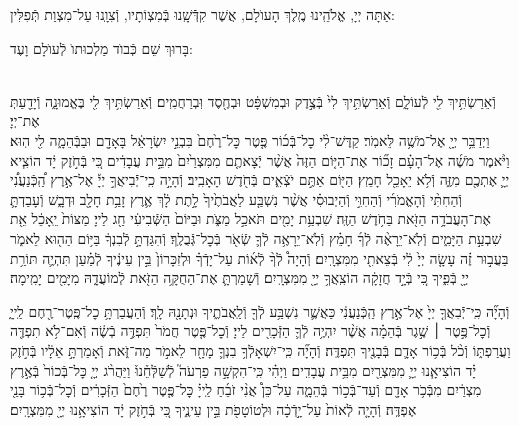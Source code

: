 \documentclass[twoside, openany, parskip=half, 11pt]{book}
\begin{document}
אַתָּה יְיָ, אֱלֹהֵֽינוּ מֶֽלֶךְ הָעוֺלָם, אֲשֶׁר קִדְּֿֿשָֽׁנוּ בְּֿמִצְוֹתָיו, וְֿצִוָֽנוּ עַל־מִצְוַת תְּֿפִלִּין:

בָּרוּךְ שֵׁם כְּֿבוֺד מַלְכוּתוֺ לְֿעוֺלָם וָעֶד:


\\
וְֿאֵרַשְׂתִּ֥יךְ לִ֖י לְֿעוֹלָ֑ם וְֿאֵרַשְׂתִּ֥יךְ לִי֙ בְּֿצֶ֣דֶק וּבְמִשְׁפָּ֔ט וּבְחֶ֖סֶד וּֽבְרַחֲמִֽים׃ וְֿאֵרַשְׂתִּ֥יךְ לִ֖י בֶּאֱמוּנָ֑ה וְֿיָדַ֖עַתְּ אֶת־יְיָ׃\\
וַיְדַבֵּ֥ר יְיָ֖ אֶל־מֹשֶׁ֥ה לֵּאמֹֽר׃ קַדֶּשׁ־לִ֨י כׇל־בְּֿכ֜וֹר פֶּ֤טֶר כׇּל־רֶ֙חֶם֙ בִּבְנֵ֣י יִשְׂרָאֵ֔ל בָּאָדָ֖ם וּבַבְּֿהֵמָ֑ה לִ֖י הֽוּא׃ וַיֹּ֨אמֶר מֹשֶׁ֜ה אֶל־הָעָ֗ם זָכ֞וֹר אֶת־הַיּ֤וֹם הַזֶּה֙ אֲשֶׁ֨ר יְֿצָאתֶ֤ם מִמִּצְרַ֙יִם֙ מִבֵּ֣ית עֲבָדִ֔ים כִּ֚י בְּֿחֹ֣זֶק יָ֔ד הוֹצִ֧יא יְיָ֛ אֶתְכֶ֖ם מִזֶּ֑ה וְֿלֹ֥א יֵאָכֵ֖ל חָמֵֽץ׃ הַיּ֖וֹם אַתֶּ֣ם יֹצְֿאִ֑ים בְּֿחֹ֖דֶשׁ הָאָבִֽיב׃ וְֿהָיָ֣ה כִֽי־יְֿֿבִיאֲךָ֣ יְיָ֡ אֶל־אֶ֣רֶץ הַֽ֠כְּֿנַעֲנִ֠י וְֿהַחִתִּ֨י וְֿהָאֱמֹרִ֜י וְֿהַחִוִּ֣י וְֿהַיְבוּסִ֗י אֲשֶׁ֨ר נִשְׁבַּ֤ע לַאֲבֹתֶ֙יךָ֙ לָ֣תֶת לָ֔ךְ אֶ֛רֶץ זָבַ֥ת חָלָ֖ב וּדְבָ֑שׁ וְֿעָבַדְתָּ֛ אֶת־הָעֲבֹדָ֥ה הַזֹּ֖את בַּחֹ֥דֶשׁ הַזֶּֽה׃ שִׁבְעַ֥ת יָמִ֖ים תֹּאכַ֣ל מַצֹּ֑ת וּבַיּוֹם֙ הַשְּֿׁבִיעִ֔י חַ֖ג לַייָ׃ מַצּוֹת֙ יֵֽאָכֵ֔ל אֵ֖ת שִׁבְעַ֣ת הַיָּמִ֑ים וְֿלֹֽא־יֵרָאֶ֨ה לְֿךָ֜ חָמֵ֗ץ וְֿלֹֽא־יֵרָאֶ֥ה לְֿךָ֛ שְֿׂאֹ֖ר בְּֿכׇל־גְּֿבֻלֶֽךָ׃ וְֿהִגַּדְתָּ֣ לְֿבִנְךָ֔ בַּיּ֥וֹם הַה֖וּא לֵאמֹ֑ר בַּעֲב֣וּר זֶ֗ה עָשָׂ֤ה יְיָ֙ לִ֔י בְּֿצֵאתִ֖י מִמִּצְרָֽיִם׃ וְֿהָיָה֩ לְֿךָ֨ לְֿא֜וֹת עַל־יָדְֿךָ֗ וּלְזִכָּרוֹן֙ בֵּ֣ין עֵינֶ֔יךָ לְֿמַ֗עַן תִּהְיֶ֛ה תּוֹרַ֥ת יְיָ֖ בְּֿפִ֑יךָ כִּ֚י בְּֿיָ֣ד חֲזָקָ֔ה הוֹצִֽאֲךָ֥ יְיָ֖ מִמִּצְרָֽיִם׃ וְֿשָׁמַרְתָּ֛ אֶת־הַחֻקָּ֥ה הַזֹּ֖את לְֿמוֹעֲדָ֑הּ מִיָּמִ֖ים יָמִֽימָה׃

וְֿהָיָ֞ה כִּֽי־יְֿֿבִאֲךָ֤ יְיָ֙ אֶל־אֶ֣רֶץ הַֽכְּֿנַעֲנִ֔י כַּאֲשֶׁ֛ר נִשְׁבַּ֥ע לְֿךָ֖ וְֿלַֽאֲבֹתֶ֑יךָ וּנְתָנָ֖הּ לָֽךְ׃ וְֿהַעֲבַרְתָּ֥ כׇל־פֶּֽטֶר־רֶ֖חֶם לַֽייָ֑ וְֿכׇל־פֶּ֣טֶר ׀ שֶׁ֣גֶר בְּֿהֵמָ֗ה אֲשֶׁ֨ר יִהְיֶ֥ה לְֿךָ֛ הַזְּֿכָרִ֖ים לַייָ׃ וְֿכׇל־פֶּ֤טֶר חֲמֹר֙ תִּפְדֶּ֣ה בְֿשֶׂ֔ה וְֿאִם־לֹ֥א תִפְדֶּ֖ה וַעֲרַפְתּ֑וֹ וְֿכֹ֨ל בְּֿכ֥וֹר אָדָ֛ם בְּֿבָנֶ֖יךָ תִּפְדֶּֽה׃ וְֿהָיָ֞ה כִּֽי־יִשְׁאָלְֿךָ֥ בִנְךָ֛ מָחָ֖ר לֵאמֹ֣ר מַה־זֹּ֑את וְֿאָמַרְתָּ֣ אֵלָ֔יו בְּֿחֹ֣זֶק יָ֗ד הוֹצִיאָ֧נוּ יְיָ֛ מִמִּצְרַ֖יִם מִבֵּ֥ית עֲבָדִֽים׃ וַיְהִ֗י כִּֽי־הִקְשָׁ֣ה פַרְעֹה֮ לְֿשַׁלְּֿחֵ֒נוּ֒ וַיַּהֲרֹ֨ג יְיָ֤ כׇּל־בְּֿכוֹר֙ בְּֿאֶ֣רֶץ מִצְרַ֔יִם מִבְּֿכֹ֥ר אָדָ֖ם וְֿעַד־בְּֿכ֣וֹר בְּֿהֵמָ֑ה עַל־כֵּן֩ אֲנִ֨י זֹבֵ֜חַ לַֽייָ֗ כׇּל־פֶּ֤טֶר רֶ֙חֶם֙ הַזְּֿכָרִ֔ים וְֿכׇל־בְּֿכ֥וֹר בָּנַ֖י אֶפְדֶּֽה׃ וְֿהָיָ֤ה לְֿאוֹת֙ עַל־יָ֣דְֿכָ֔ה וּלְטוֹטָפֹ֖ת בֵּ֣ין עֵינֶ֑יךָ כִּ֚י בְּֿחֹ֣זֶק יָ֔ד הוֹצִיאָ֥נוּ יְיָ֖ מִמִּצְרָֽיִם׃
\end{document}
